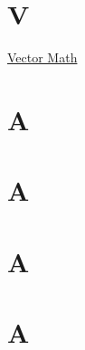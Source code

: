 \documentclass[]{book}
\begin{document}
\hypertarget{v}{%
\chapter*{V}\label{v}}

\href{https://linkedin-learning.pxf.io/rweekly_vectormath}{Vector Math}

\hypertarget{a-18}{%
\chapter*{A}\label{a-18}}

\hypertarget{a-19}{%
\chapter*{A}\label{a-19}}

\hypertarget{a-20}{%
\chapter*{A}\label{a-20}}

\hypertarget{a-21}{%
\chapter*{A}\label{a-21}}
\end{document}
